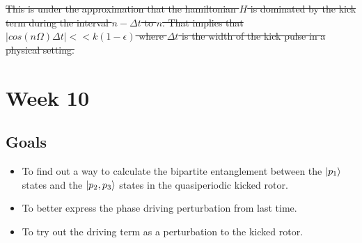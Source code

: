 \documentclass[12pt]{article}
\begin{document}
\sout{This is under the approximation that the hamiltonian $H$ is
dominated by the kick term during the interval $n-\Delta t$ to $n$.
That implies that $|cos(n\Omega)\Delta t| << k (1 - \epsilon)$ where
$\Delta t$ is the width of the kick pulse in a physical setting.}


\section{Week 10}
\subsection{Goals}
\begin{itemize}
    \item To find out a way to calculate the bipartite entanglement between the
    $\ket{p_1}$ states and the $\ket{p_2, p_3}$ states in the quasiperiodic
    kicked rotor.

    \item To better express the phase driving perturbation from last time.

    \item To try out the driving term as a perturbation to the kicked rotor.
\end{itemize}
\end{document}
